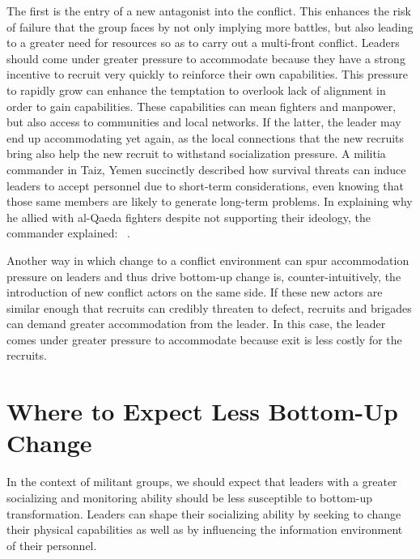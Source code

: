 The first is the entry of a new antagonist into the conflict. This enhances the risk of failure that the group faces by not only implying more battles, but also leading to a greater need for resources so as to carry out a multi-front conflict. Leaders should come under greater pressure to accommodate because they have a strong incentive to recruit very quickly to reinforce their own capabilities.  This pressure to rapidly grow can enhance the temptation to overlook lack of alignment in order to gain capabilities. These capabilities can mean fighters and manpower, but also access to communities and local networks. If the latter, the leader may end up accommodating yet again, as the local connections that the new recruits bring also help the new recruit to withstand socialization pressure. A militia commander in Taiz, Yemen succinctly described how survival threats can induce leaders to accept personnel due to short-term considerations, even knowing that those same members are likely to generate long-term problems. In explaining why he allied with al-Qaeda fighters despite not supporting their ideology, the commander explained: ~\autocite[7]{horton2017fighting}.

Another way in which change to a conflict environment can spur accommodation pressure on leaders and thus drive bottom-up change is, counter-intuitively, the introduction of new conflict actors on the same side. If these new actors are similar enough that recruits can credibly threaten to defect, recruits and brigades can demand greater accommodation from the leader. In this case, the leader comes under greater pressure to accommodate because exit is less costly for the recruits. %

\section{Where to Expect Less Bottom-Up Change}

In the context of militant groups, we should expect that leaders with a greater socializing and monitoring ability should be less susceptible to bottom-up transformation. Leaders can shape their socializing ability by seeking to change their physical capabilities as well as by influencing the information environment of their personnel.

